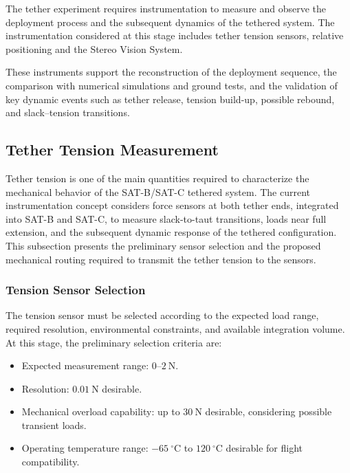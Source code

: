 The tether experiment requires instrumentation to measure and observe the deployment process and the subsequent dynamics of the tethered system. The instrumentation considered at this stage includes tether tension sensors, relative positioning and the Stereo Vision System.

These instruments support the reconstruction of the deployment sequence, the comparison with numerical simulations and ground tests, and the validation of key dynamic events such as tether release, tension build-up, possible rebound, and slack--tension transitions.

\subsection{Tether Tension Measurement}
\label{sub:tether_tension_measurement}

Tether tension is one of the main quantities required to characterize the mechanical behavior of the SAT-B/SAT-C tethered system. The current instrumentation concept considers force sensors at both tether ends, integrated into SAT-B and SAT-C, to measure slack-to-taut transitions, loads near full extension, and the subsequent dynamic response of the tethered configuration. This subsection presents the preliminary sensor selection and the proposed mechanical routing required to transmit the tether tension to the sensors.

\subsubsection{Tension Sensor Selection}
\label{subsub:tension_sensor_selection}

The tension sensor must be selected according to the expected load range, required resolution, environmental constraints, and available integration volume. At this stage, the preliminary selection criteria are:

\begin{itemize}
    \item Expected measurement range: \(0\)--\(2~\mathrm{N}\).
    \item Resolution: \(0.01~\mathrm{N}\) desirable.
    \item Mechanical overload capability: up to \(30~\mathrm{N}\) desirable, considering possible transient loads.
    \item Operating temperature range: \(-65~^\circ\mathrm{C}\) to \(120~^\circ\mathrm{C}\) desirable for flight compatibility.
\end{itemize}

